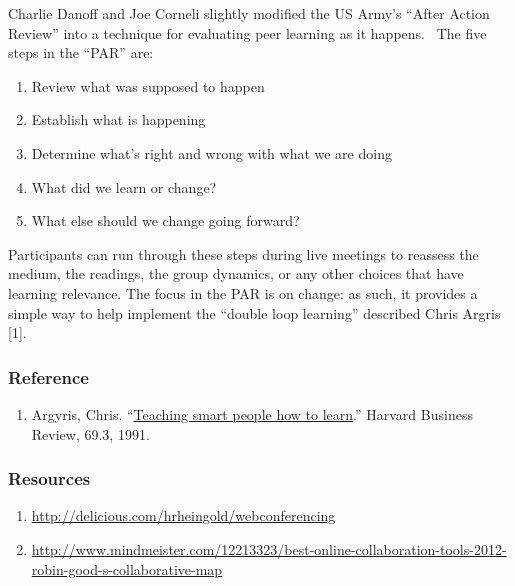 Charlie Danoff and Joe Corneli slightly modified the US Army's ``After
Action Review'' into a technique for evaluating peer learning as it
happens.~ The five steps in the ``PAR'' are:

\begin{enumerate}
\itemsep1pt\parskip0pt
\item
  Review what was supposed to happen
\item
  Establish what is happening
\item
  Determine what's right and wrong with what we are doing
\item
  What did we learn or change?
\item
  What else should we change going forward?
\end{enumerate}

Participants can run through these steps during live meetings to
reassess the medium, the readings, the group dynamics, or any other
choices that have learning relevance. The focus in the PAR is on change:
as such, it provides a simple way to help implement the ``double loop
learning'' described Chris Argris {[}1{]}.

\subsubsection{Reference}

\begin{enumerate}
\itemsep1pt\parskip0pt
\item
  Argyris, Chris.
  ``\href{http://pds8.egloos.com/pds/200805/20/87/chris_argyris_learning.pdf}{Teaching
  smart people how to learn}.'' Harvard Business Review, 69.3, 1991.
\end{enumerate}

\subsubsection{Resources}

\begin{enumerate}
\itemsep1pt\parskip0pt
\item {\small \url{http://delicious.com/hrheingold/webconferencing}}
\item {\small \url{http://www.mindmeister.com/12213323/best-online-collaboration-tools-2012-robin-good-s-collaborative-map}}
\end{enumerate}

